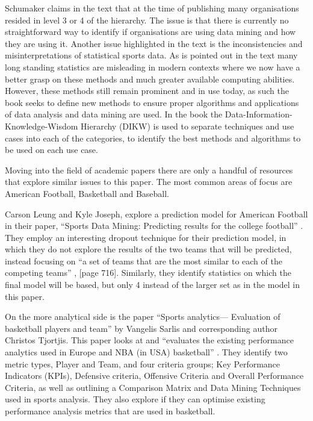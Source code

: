 \documentclass{imc-inf}
\begin{document}
	Schumaker claims in the text that at the time of publishing many organisations resided in level 3 or 4 of the hierarchy.  The issue is that there is currently no straightforward way to identify if organisations are using data mining and how they are using it. 
	Another issue highlighted in the text is the inconsistencies and misinterpretations of statistical sports data. As is pointed out in the text many long standing statistics are misleading in modern contexts where we now have a better grasp on these methods and much greater available computing abilities. However, these methods still remain prominent and in use today, as such the book seeks to define new methods to ensure proper algorithms and applications of data analysis and data mining are used. 
	In the book the Data-Information-Knowledge-Wisdom Hierarchy (DIKW) is used to separate techniques and use cases into each of the categories, to identify the best methods and algorithms to be used on each use case. 
		
	Moving into the field of academic papers there are only a handful of resources that explore similar issues to this paper. The most common areas of focus are American Football, Basketball and Baseball. 
	
	Carson Leung and Kyle Joseph, explore a prediction model for American Football in their paper, “Sports Data Mining: Predicting results for the college football” \cite{CollegeFootball}. They employ an interesting dropout technique for their prediction model, in which they do not explore the results of the two teams that will be predicted, instead focusing on “a set of teams that are the most similar to each of the competing teams” \cite{CollegeFootball}, [page 716]. Similarly, they identify statistics on which the final model will be based, but only 4 instead of the larger set as in the model in this paper.
	
	On the more analytical side is the paper “Sports analytics— Evaluation of basketball players and team” by Vangelis Sarlis and corresponding author Christos Tjortjis. This paper looks at and “evaluates the existing performance analytics used in Europe and NBA (in USA) basketball” \cite{Basketball}. They identify two metric types, Player and Team, and four criteria groups; Key Performance Indicators (KPIs), Defensive criteria, Offensive Criteria and Overall Performance Criteria, as well as outlining a Comparison Matrix and Data Mining Techniques used in sports analysis. They also explore if they can optimise existing performance analysis metrics that are used in basketball. 
	
\end{document}
